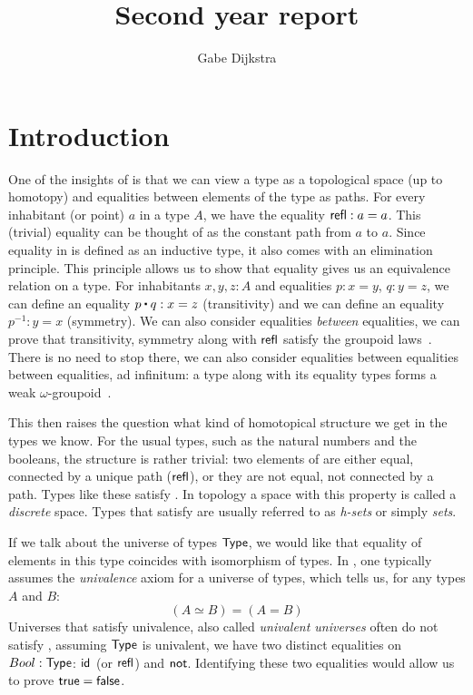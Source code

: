 \documentclass[a4paper,10pt]{report}
\title{Second year report}
\author{Gabe Dijkstra}
\begin{document}
\maketitle

\chapter{Introduction}
\label{sec:introduction}

One of the insights of \hott is that we can view a type as a
topological space (up to homotopy) and equalities between elements of
the type as paths. For every inhabitant (or point) $a$ in a type $A$,
we have the equality $\operatorname{\mathsf{refl}} : a = a$. This (trivial) equality can be
thought of as the constant path from $a$ to $a$. Since equality in
\mltt is defined as an inductive type, it also comes with an
elimination principle. This principle allows us to show that equality
gives us an equivalence relation on a type. For inhabitants
$x, y, z : A$ and equalities $p : x = y$, $q : y = z$, we can define
an equality $p \ct q : x = z$ (transitivity) and we can define an
equality $p^{-1} : y = x$ (symmetry). We can also consider equalities
\emph{between} equalities, \eg we can prove that transitivity,
symmetry along with $\operatorname{\mathsf{refl}}$ satisfy the groupoid
laws~\cite{Hofmann1998}. There is no need to stop there, we can also
consider equalities between equalities between equalities, ad
infinitum: a type along with its equality types forms a weak
$\omega$-groupoid~\cite{VanDenBerg2008}.

This then raises the question what kind of homotopical structure we
get in the types we know. For the usual types, such as the natural
numbers and the booleans, the structure is rather trivial: two
elements of are either equal, connected by a unique path ($\operatorname{\mathsf{refl}}$), or
they are not equal, \ie not connected by a path. Types like these
satisfy \emph{\uip}. In topology a space with this property is called
a \emph{discrete} space. Types that satisfy \uip are usually referred
to as \emph{h-sets} or simply \emph{sets}.

If we talk about the universe of types $\mathsf{Type}$, we would like that
equality of elements in this type coincides with isomorphism of
types. In \hott, one typically assumes the \emph{univalence} axiom for
a universe of types, which tells us, for any types $A$ and $B$:
$$
(A \simeq B) = (A = B)
$$
Universes that satisfy univalence, also called \emph{univalent
  universes} often do not satisfy \uip, \eg assuming $\mathsf{Type}$ is
univalent, we have two distinct equalities on $Bool : \mathsf{Type}$: $\mathsf{id}_{}$
(or $\operatorname{\mathsf{refl}}$) and $\operatorname{\mathsf{not}}$. Identifying these two equalities would
allow us to prove $\mathsf{true} = \mathsf{false}$.
\end{document}
